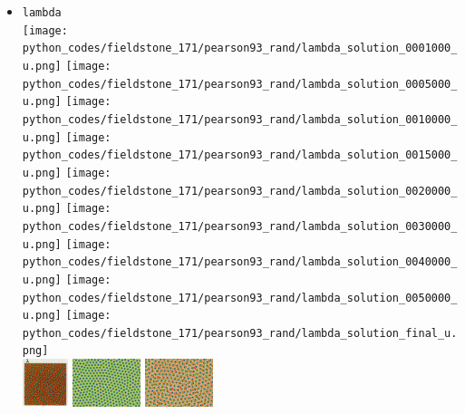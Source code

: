 \begin{itemize}
\item {\tt lambda}\\
\texttt{[image: python\_codes/fieldstone\_171/pearson93\_rand/lambda\_solution\_0001000\_u.png]}
\texttt{[image: python\_codes/fieldstone\_171/pearson93\_rand/lambda\_solution\_0005000\_u.png]}
\texttt{[image: python\_codes/fieldstone\_171/pearson93\_rand/lambda\_solution\_0010000\_u.png]}
\texttt{[image: python\_codes/fieldstone\_171/pearson93\_rand/lambda\_solution\_0015000\_u.png]}
\texttt{[image: python\_codes/fieldstone\_171/pearson93\_rand/lambda\_solution\_0020000\_u.png]}
\texttt{[image: python\_codes/fieldstone\_171/pearson93\_rand/lambda\_solution\_0030000\_u.png]}
\texttt{[image: python\_codes/fieldstone\_171/pearson93\_rand/lambda\_solution\_0040000\_u.png]}
\texttt{[image: python\_codes/fieldstone\_171/pearson93\_rand/lambda\_solution\_0050000\_u.png]}
\texttt{[image: python\_codes/fieldstone\_171/pearson93\_rand/lambda\_solution\_final\_u.png]}\\
\includegraphics[height=1.4cm]{python_codes/fieldstone_171/images/pear93_lambda}
\includegraphics[height=1.4cm]{python_codes/fieldstone_171/images/munafo_lambda1}
\includegraphics[height=1.4cm]{python_codes/fieldstone_171/images/munafo_lambda2}


\end{itemize}
